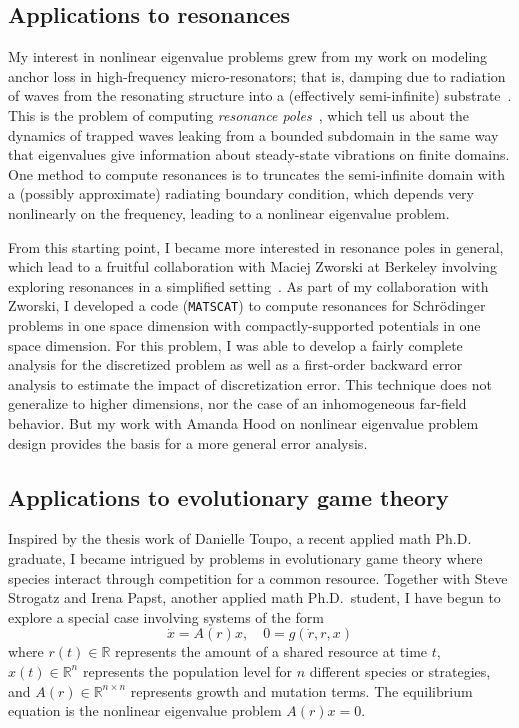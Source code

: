 \documentclass[11pt]{amsart}
\newcommand{\bbR}{\mathbb{R}}
\begin{document}
\subsection*{Applications to resonances}

My interest in nonlinear eigenvalue problems grew from my work on
modeling anchor loss in high-frequency micro-resonators; that is,
damping due to radiation of waves from the resonating structure into a
(effectively semi-infinite)
substrate~\cite{2004-para,2005-mems,2005-ijnme,2005-sensors}.
This is the problem of computing
{\em resonance poles}~\cite{Bindel:2006:ROD,Zworski:1999:RIP},
which tell us about
the dynamics of trapped waves leaking from a bounded
subdomain in the same way that eigenvalues give information about
steady-state vibrations on finite domains.
One method to compute resonances is to truncates the semi-infinite
domain with a (possibly approximate) radiating boundary condition, which
depends very nonlinearly on the frequency, leading to a nonlinear
eigenvalue problem.

From this starting point, I became more interested in resonance poles in
general, which lead to a fruitful collaboration with Maciej Zworski at
Berkeley involving exploring resonances in a simplified
setting~\cite{2007-symmetry}.  As part of my collaboration with Zworski,
I developed a code ({\tt MATSCAT}) to compute resonances for
Schr{\"o}dinger problems in one space dimension with compactly-supported
potentials in one space dimension.  For this problem, I was able to
develop a fairly complete analysis for the discretized problem as well
as a first-order backward error analysis to estimate the impact of
discretization error.  This technique does not generalize to higher
dimensions, nor the case of an inhomogeneous far-field behavior.  But
my work with Amanda Hood on nonlinear eigenvalue problem design provides
the basis for a more general error analysis.

\subsection*{Applications to evolutionary game theory}

Inspired by the thesis work of Danielle Toupo, a recent applied math
Ph.D. graduate, I became intrigued by problems in
evolutionary game theory where species interact through competition for
a common resource.  Together with Steve Strogatz and Irena Papst,
another applied math Ph.D.~student, I have begun to explore a
special case involving systems of the form
\[
  \dot{x} = A(r) x, \quad  0 = g(\dot{r}, r, x)
\]
where $r(t) \in \bbR$ represents the amount of a shared resource at
time $t$, $x(t) \in \bbR^n$ represents the population level for $n$
different species or strategies, and $A(r) \in \bbR^{n \times n}$
represents growth and mutation terms.  The equilibrium equation is
the nonlinear eigenvalue problem $A(r) x = 0$.
\end{document}
